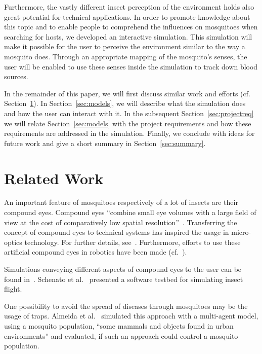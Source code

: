 \documentclass{sig-alternate-05-2015}
\begin{document}
Furthermore, the vastly different insect perception of the environment holds also great potential for technical applications.
In order to promote knowledge about this topic and to enable people to comprehend the influences on mosquitoes when searching for hosts, we developed an interactive simulation. This simulation will make it possible for the user to perceive the environment similar to the way a mosquito does. Through an appropriate mapping of the mosquito's senses, the user will be enabled to use these senses inside the simulation to track down blood sources.

In the remainder of this paper, we will first discuss similar work and efforts (cf. Section~\ref{sec:relatedwork}). In Section~\ref{sec:models}, we will describe what the simulation does and how the user can interact with it. In the subsequent Section~\ref{sec:projectreq} we will relate Section~\ref{sec:models} with the project requirements and how these requirements are addressed in the simulation. Finally, we conclude with ideas for future work and give a short summary in Section~\ref{sec:summary}.

\section{Related Work}
\label{sec:relatedwork}
\noindent
An important feature of mosquitoes respectively of a lot of insects are their compound eyes. Compound eyes ``combine small eye volumes with a large field of view at the cost of comparatively low spatial resolution''~\cite{duparre2006}. Transferring the concept of compound eyes to technical systems has inspired the usage in micro-optics technology. For further details, see~\cite{duparre2006, duparre2004, voelkel2003, hamanaka1996}.
Furthermore, efforts to use these artificial compound eyes in robotics have been made (cf.~\cite{martin1994, lichtensteiger1999}). 

Simulations conveying different aspects of compound eyes to the user can be found in~\cite{giger, vorobyev1996, williams2007}.
Schenato et al.~\cite{schenato2001} presented a software testbed for simulating insect flight.

One possibility to avoid the spread of diseases through mosquitoes may be the usage of traps. Almeida et al.~\cite{almeida2010} simulated this approach with a multi-agent model, using a mosquito population, ``some mammals and objects found in urban environments'' and evaluated, if such an approach could control a mosquito population. 
\end{document}
